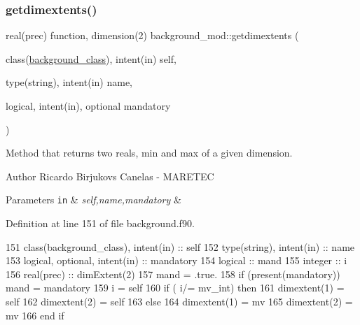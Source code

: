 \subsubsection{\texorpdfstring{getdimextents()}{getdimextents()}}
{\footnotesize\ttfamily real(prec) function, dimension(2) background\+\_\+mod\+::getdimextents (\begin{DoxyParamCaption}\item[{class(\mbox{\hyperlink{structbackground__mod_1_1background__class}{background\+\_\+class}}), intent(in)}]{self,  }\item[{type(string), intent(in)}]{name,  }\item[{logical, intent(in), optional}]{mandatory }\end{DoxyParamCaption})\hspace{0.3cm}{\ttfamily [private]}}



Method that returns two reals, min and max of a given dimension. 

\begin{DoxyAuthor}{Author}
Ricardo Birjukovs Canelas -\/ M\+A\+R\+E\+T\+EC 
\end{DoxyAuthor}

\begin{DoxyParams}[1]{Parameters}
\mbox{\tt in}  & {\em self,name,mandatory} & \\
\hline
\end{DoxyParams}


Definition at line 151 of file background.\+f90.


\begin{DoxyCode}
151     \textcolor{keywordtype}{class}(background\_class), \textcolor{keywordtype}{intent(in)} :: self
152     \textcolor{keywordtype}{type}(string), \textcolor{keywordtype}{intent(in)} :: name
153     \textcolor{keywordtype}{logical}, \textcolor{keywordtype}{optional}, \textcolor{keywordtype}{intent(in)} :: mandatory
154     \textcolor{keywordtype}{logical} :: mand
155     \textcolor{keywordtype}{integer} :: i
156     \textcolor{keywordtype}{real(prec)} :: dimExtent(2)
157     mand = .true.
158     \textcolor{keywordflow}{if} (\textcolor{keyword}{present}(mandatory)) mand = mandatory
159     i = self%
160     \textcolor{keywordflow}{if} ( i/= mv\_int) \textcolor{keywordflow}{then}
161         dimextent(1) = self%
162         dimextent(2) = self%
163     \textcolor{keywordflow}{else}
164         dimextent(1) = mv
165         dimextent(2) = mv
166 \textcolor{keywordflow}{    end if}
\end{DoxyCode}
\mbox{\label{namespacebackground__mod_a8a4c5fdcda63376bc3a984e9612dfb63}} 

